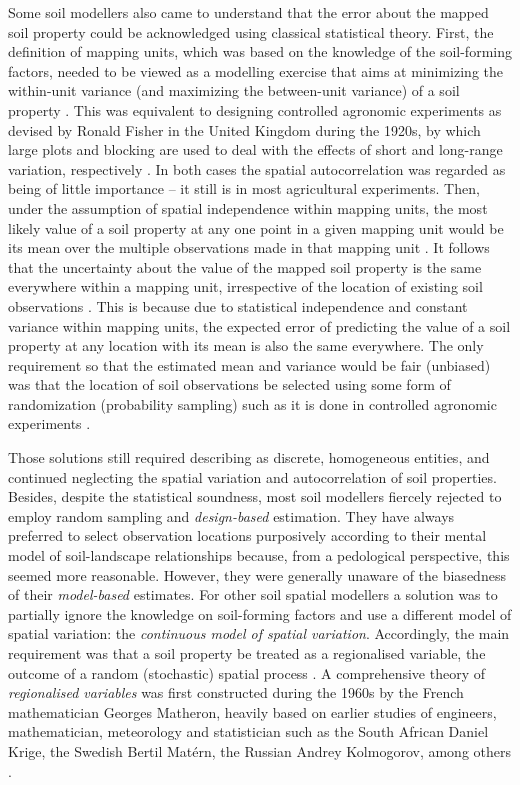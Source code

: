 Some soil modellers also came to understand that the error about the mapped soil property could be 
acknowledged using classical statistical theory. First, the definition of mapping units, which was based on 
the knowledge of the soil-forming factors, needed to be viewed as a modelling exercise that aims at minimizing 
the within-unit variance (and maximizing the between-unit variance) of a soil property \cite{VoltzEtAl1990}. 
This was equivalent to designing controlled agronomic experiments as devised by Ronald Fisher in the United 
Kingdom during the 1920s, by which large plots and blocking are used to deal with the effects of short and 
long-range variation, respectively \cite{WebsterEtAl2007}. In both cases the spatial autocorrelation was 
regarded as being of little importance -- it still is in most agricultural experiments. Then, under the 
assumption of spatial independence within mapping units, the most likely value of a soil property at any one 
point in a given mapping unit would be its mean over the multiple observations made in that mapping unit 
\cite{VoltzEtAl1990, Cressie1993}. It follows that the uncertainty about the value of the mapped soil property
is the same everywhere within a mapping unit, irrespective of the location of existing soil observations 
\cite{Heuvelink1996}. This is because due to statistical independence and constant variance within mapping 
units, the expected error of predicting the value of a soil property at any location with its mean is also the
same everywhere. The only requirement so that the estimated mean and variance would be fair (unbiased) was 
that the location of soil observations be selected using some form of randomization (probability sampling) 
such as it is done in controlled agronomic experiments \cite{deGruijterEtAl1990}.

Those solutions still required describing  as discrete, homogeneous entities, and continued 
neglecting the spatial variation and autocorrelation of soil properties. Besides, despite the statistical 
soundness, most soil modellers fiercely rejected to employ random sampling and \emph{design-based} estimation. 
They have always preferred to select observation locations purposively according to their mental model of 
soil-landscape relationships because, from a pedological perspective, this seemed more reasonable. However, 
they were generally unaware of the biasedness of their \emph{model-based} estimates. For other soil spatial 
modellers a solution was to partially ignore the knowledge on soil-forming factors and use a different model 
of spatial variation: the \emph{continuous model of spatial variation}. Accordingly, the main requirement was 
that a soil property be treated as a regionalised variable, the outcome of a random (stochastic) spatial 
process \cite{Cressie1993, Webster2000}. A comprehensive theory of \emph{regionalised variables} was first 
constructed during the 1960s by the French mathematician Georges Matheron, heavily based on earlier studies of 
engineers, mathematician, meteorology and statistician such as the South African Daniel Krige, the Swedish 
Bertil Matérn, the Russian Andrey Kolmogorov, among others \cite{Krige1951, Matern1960, Matheron1965, 
MatheronEtAl1987, Cressie1990, WebsterEtAl2007}.

